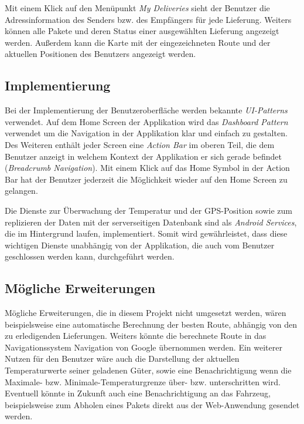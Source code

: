 Mit einem Klick auf den Menüpunkt \emph{My Deliveries} sieht der Benutzer die Adressinformation des Senders bzw. des Empfängers für jede Lieferung.
Weiters können alle Pakete und deren Status einer ausgewählten Lieferung angezeigt werden. 
Außerdem kann die Karte mit der eingezeichneten Route und der aktuellen Positionen des Benutzers angezeigt werden.

\subsection{Implementierung}

Bei der Implementierung der Benutzeroberfläche werden bekannte \emph{UI-Patterns} verwendet. Auf dem Home Screen der Applikation
wird das \emph{Dashboard Pattern} verwendet um die Navigation in der Applikation klar und einfach zu gestalten. Des Weiteren enthält jeder
Screen eine \emph{Action Bar} im oberen Teil, die dem Benutzer anzeigt in welchem Kontext der Applikation er sich gerade befindet (\emph{Breadcrumb Navigation}).
Mit einem Klick auf das Home Symbol in der Action Bar hat der Benutzer jederzeit die Möglichkeit wieder auf den Home Screen zu gelangen.

Die Dienste zur Überwachung der Temperatur und der GPS-Position sowie zum replizieren der Daten mit der serverseitigen Datenbank sind als \emph{Android Services},
die im Hintergrund laufen, implementiert. Somit wird gewährleistet, dass diese wichtigen Dienste unabhängig von der Applikation, die auch vom Benutzer geschlossen werden kann,
durchgeführt werden.

\subsection{Mögliche Erweiterungen}

Mögliche Erweiterungen, die in diesem Projekt nicht umgesetzt werden, wären beispielsweise eine automatische Berechnung der besten Route, abhängig
von den zu erledigenden Lieferungen. Weiters könnte die berechnete Route in das Navigationssystem Navigation von Google übernommen werden.
Ein weiterer Nutzen für den Benutzer wäre auch die Darstellung der aktuellen Temperaturwerte seiner geladenen Güter, sowie eine Benachrichtigung wenn die Maximale- bzw. Minimale-Temperaturgrenze über- bzw. unterschritten wird. Eventuell könnte in Zukunft auch eine Benachrichtigung an das Fahrzeug, beispielsweise zum Abholen eines Pakets direkt
aus der Web-Anwendung gesendet werden.

